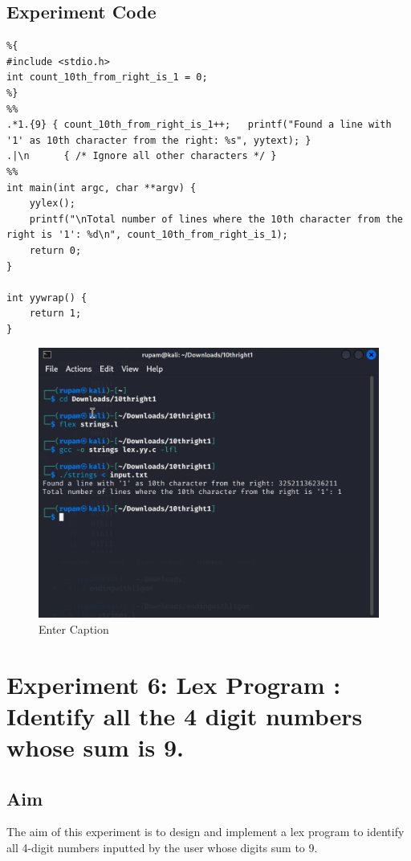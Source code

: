 \documentclass[12pt]{article}
\begin{document}
\subsection*{Experiment Code}
\begin{lstlisting}
%{
#include <stdio.h>
int count_10th_from_right_is_1 = 0;
%}
%%
.*1.{9} { count_10th_from_right_is_1++;   printf("Found a line with '1' as 10th character from the right: %s", yytext); }
.|\n      { /* Ignore all other characters */ }
%%
int main(int argc, char **argv) {
    yylex();
    printf("\nTotal number of lines where the 10th character from the right is '1': %d\n", count_10th_from_right_is_1);
    return 0;
}

int yywrap() {
    return 1;
}
\end{lstlisting}
\begin{figure}[H]
    \centering
    \includegraphics[width=1\linewidth]{exp5output.png}
    \caption{Enter Caption}
\end{figure}

\newpage
\section*{Experiment 6: Lex Program : Identify all the 4 digit numbers whose sum is 9.}

\subsection*{Aim}
The aim of this experiment is to design and implement a lex program to identify all 4-digit numbers inputted by the user whose digits sum to 9.
\end{document}
